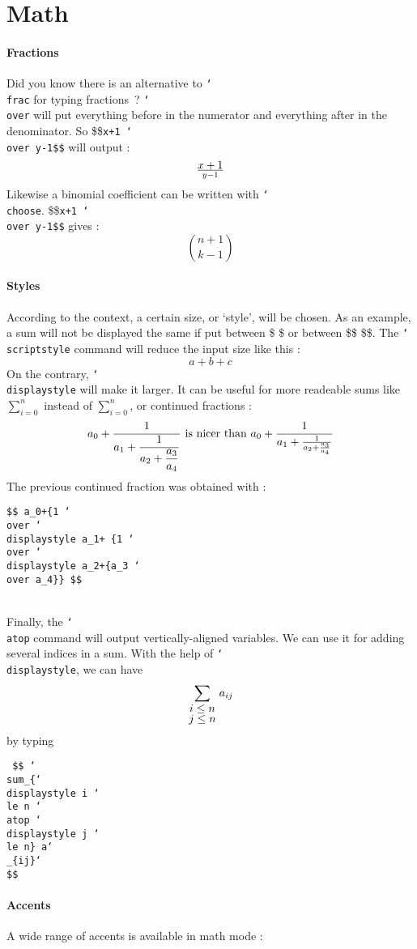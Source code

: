\documentclass{article}
\newcommand\bSLASH{\char`\\}
\begin{document}
\section{Math}
\paragraph{Fractions}
Did you know there is an alternative to \texttt{\bSLASH frac} for typing fractions ?
{\tt \bSLASH over} will put everything before in the numerator and everything
after in the denominator. So {\$\$\tt x+1 \bSLASH over y-1\$\$} will output
:\\
$$ x+1 \over y-1$$
Likewise a binomial coefficient can be written with {\tt \bSLASH choose}. 
{\$\$\tt x+1 \bSLASH over y-1\$\$} gives :
$$ n+1 \choose k-1$$

\paragraph{Styles}
According to the context, a certain size, or `style', will be chosen. 
As an example, a sum will not be displayed the same if put between \$ \$ or between \$\$ \$\$. 
The {\tt \bSLASH scriptstyle} command will reduce the input size like this :
$$ a+\scriptstyle b+\scriptstyle c$$
On the contrary, {\tt \bSLASH displaystyle} will make it larger. It can be useful
for more readeable sums like $\displaystyle \sum_{i=0}^{n}$ instead of 
$ \sum_{i=0}^{n}$, or continued fractions :
$$ a_0 + {1 \over \displaystyle a_1+ {1 \over \displaystyle a_2 + {a_3 \over  a_4}}}
\mbox{ is nicer than }
a_0 + {1 \over  a_1+ {1 \over  a_2 + {a_3 \over  a_4}}}$$
The previous continued fraction was obtained with :\\
\centerline{\tt \$\$ a\_0+\{1 \bSLASH over \bSLASH displaystyle a\_1+
\{1 \bSLASH over \bSLASH displaystyle a\_2+\{a\_3 \bSLASH over
a\_4\}\} \$\$}\\
Finally, the {\tt \bSLASH atop} command will output vertically-aligned variables.
We can use it for adding several indices in a sum. With the help of {\tt \bSLASH
displaystyle}, we can have
$$ \sum_{\displaystyle i \le n \atop \displaystyle j \le n} a_{ij} $$
by typing \\
\centerline{ \tt 
\$\$ \bSLASH sum\_\{\bSLASH displaystyle i \bSLASH le n \bSLASH atop 
 \bSLASH displaystyle j \bSLASH le n\} a\bSLASH \_\{ij\}\bSLASH \$\$
}

\paragraph{Accents} A wide range of accents is available in math mode :
\end{document}
